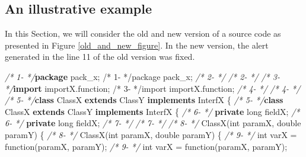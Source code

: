 \documentclass[
]{article}
\newenvironment{Shaded}{\begin{snugshade}}{\end{snugshade}}
\newcommand{\CommentTok}[1]{\textcolor[rgb]{0.56,0.35,0.01}{\textit{#1}}}
\newcommand{\DataTypeTok}[1]{\textcolor[rgb]{0.13,0.29,0.53}{#1}}
\newcommand{\FunctionTok}[1]{\textcolor[rgb]{0.00,0.00,0.00}{#1}}
\newcommand{\ImportTok}[1]{#1}
\newcommand{\KeywordTok}[1]{\textcolor[rgb]{0.13,0.29,0.53}{\textbf{#1}}}
\newcommand{\NormalTok}[1]{#1}
\begin{document}
\subsection{An illustrative example}\label{source_used}

In this Section, we will consider the old and new version of a source
code as presented in Figure \ref{old_and_new_figure}. In the new
version, the alert generated in the line 11 of the old version was
fixed.

\scriptsize

\begin{Shaded}
\begin{Highlighting}[]
\CommentTok{/*  1-   */}\KeywordTok{package}\ImportTok{ pack_x;                                          /*  1-   */package pack_x;}                                          
\CommentTok{/*  2-   */}                                                         \CommentTok{/*  2-   */}                                                         
\CommentTok{/*  3-   */}\KeywordTok{import}\ImportTok{ importX.function;                                 /*  3-   */import importX.function;}                                 
\CommentTok{/*  4-   */}                                                         \CommentTok{/*  4-   */}                                                         
\CommentTok{/*  5-   */}\KeywordTok{class}\NormalTok{ ClassX }\KeywordTok{extends}\NormalTok{ ClassY }\KeywordTok{implements}\NormalTok{ InterfX \{         }\CommentTok{/*  5-   */}\KeywordTok{class}\NormalTok{ ClassX }\KeywordTok{extends}\NormalTok{ ClassY }\KeywordTok{implements}\NormalTok{ InterfX \{         }
\CommentTok{/*  6-   */}    \KeywordTok{private} \DataTypeTok{long}\NormalTok{ fieldX;                                 }\CommentTok{/*  6-   */}    \KeywordTok{private} \DataTypeTok{long}\NormalTok{ fieldX;                                 }
\CommentTok{/*  7-   */}                                                         \CommentTok{/*  7-   */}                                                         
\CommentTok{/*  8-   */}    \FunctionTok{ClassX}\NormalTok{(}\DataTypeTok{int}\NormalTok{ paramX, }\DataTypeTok{double}\NormalTok{ paramY) \{                  }\CommentTok{/*  8-   */}    \FunctionTok{ClassX}\NormalTok{(}\DataTypeTok{int}\NormalTok{ paramX, }\DataTypeTok{double}\NormalTok{ paramY) \{                  }
\CommentTok{/*  9-   */}        \DataTypeTok{int}\NormalTok{ varX = }\FunctionTok{function}\NormalTok{(paramX, paramY);                  }\CommentTok{/*  9-   */}        \DataTypeTok{int}\NormalTok{ varX = }\FunctionTok{function}\NormalTok{(paramX, paramY);                     }

\end{Highlighting}
\end{Shaded}
\end{document}
